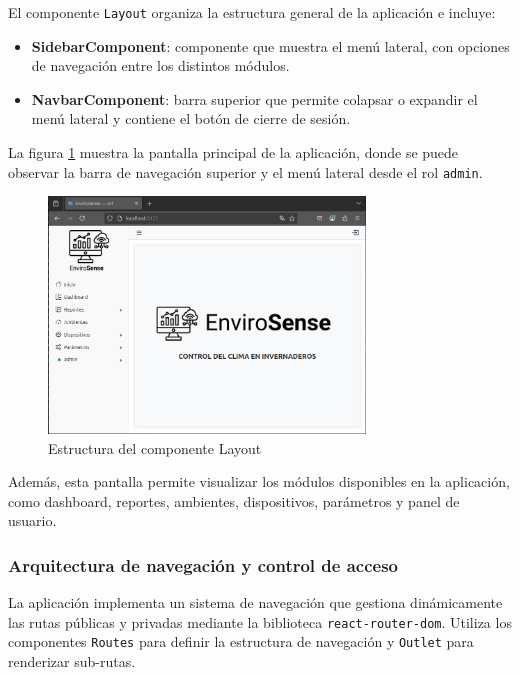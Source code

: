 El componente \texttt{Layout} organiza la estructura general de la aplicación e
incluye:
\begin{itemize}
    \item \textbf{SidebarComponent}: componente que muestra el menú lateral, con
          opciones de navegación entre los distintos módulos.
    \item \textbf{NavbarComponent}: barra superior que permite colapsar o expandir
          el menú lateral y contiene el botón de cierre de sesión.
\end{itemize}

La figura \ref{fig:layout} muestra la pantalla principal de la aplicación,
donde se puede observar la barra de navegación superior y el menú lateral desde
el rol \texttt{admin}.

\begin{figure}[H]
    \centering
    \includegraphics[width=0.75\textwidth]{./Images/25_layout.png}
    \caption{Estructura del componente Layout}
    \label{fig:layout}
\end{figure}

Además, esta pantalla permite visualizar los módulos disponibles en la
aplicación, como dashboard, reportes, ambientes, dispositivos, parámetros y
panel de usuario.

\subsubsection{Arquitectura de navegación y control de acceso}

La aplicación implementa un sistema de navegación que gestiona dinámicamente
las rutas públicas y privadas mediante la biblioteca \texttt{react-router-dom}.
Utiliza los componentes \texttt{Routes} para definir la estructura de
navegación y \texttt{Outlet} para renderizar sub-rutas.

